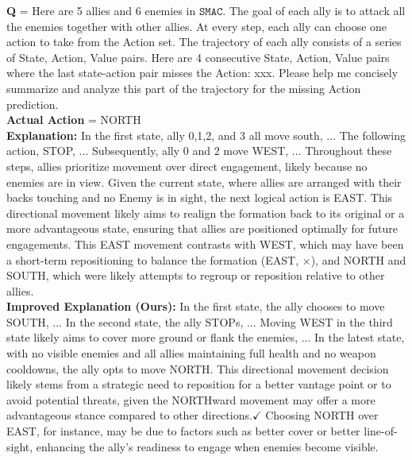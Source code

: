 
\begin{tcolorbox}[title=An example on $\mathtt{SMAC}$ that a negative explanation generated by the \rlm~is optimized to a positive explanation after training for two rounds]

\textbf{Q} = Here are 5 allies and 6 enemies in $\mathtt{SMAC}$. The goal of each ally is to attack all the enemies together with other allies. At every step, each ally can choose one action to take from the Action set. The trajectory of each ally consists of a series of State, Action, Value pairs. Here are 4 consecutive State, Action, Value pairs where the last state-action pair misses the Action: xxx. Please help me concisely summarize and analyze this part of the trajectory for the missing Action prediction.\\

    \textbf{Actual Action} = NORTH\\
    
    \textbf{{Explanation:}} In the first state, ally 0,1,2, and 3 all move south, ... The following action, STOP, ... Subsequently, ally 0 and 2 move WEST, ... Throughout these steps, allies prioritize movement over direct engagement, likely because no enemies are in view. Given the current state, where allies are arranged with their backs touching and no Enemy is in sight, the next logical action is EAST. This directional movement likely aims to realign the formation back to its original or a more advantageous state, ensuring that allies are positioned optimally for future engagements. {\color{red}This EAST movement contrasts with WEST, which may have been a short-term repositioning to balance the formation }{\color{red}(EAST, $\boldsymbol{\times}$)}, and NORTH and SOUTH, which were likely attempts to regroup or reposition relative to other allies. \\
    
    \textbf{{Improved Explanation (Ours):}}   In the first state, the ally chooses to move SOUTH, ... In the second state, the ally STOPs, ... Moving WEST in the third state likely aims to cover more ground or flank the enemies, ... In the latest state, with no visible enemies and all allies maintaining full health and no weapon cooldowns, the ally opts to move NORTH. This directional movement decision likely stems from a strategic need to reposition for a better vantage point or to avoid potential threats, \textcolor{outputcolor} {given the NORTHward movement may offer a more advantageous stance compared to other directions.$\checkmark$} Choosing NORTH over EAST, for instance, may be due to factors such as better cover or better line-of-sight, enhancing the ally's readiness to engage when enemies become visible.  \\

\end{tcolorbox}



